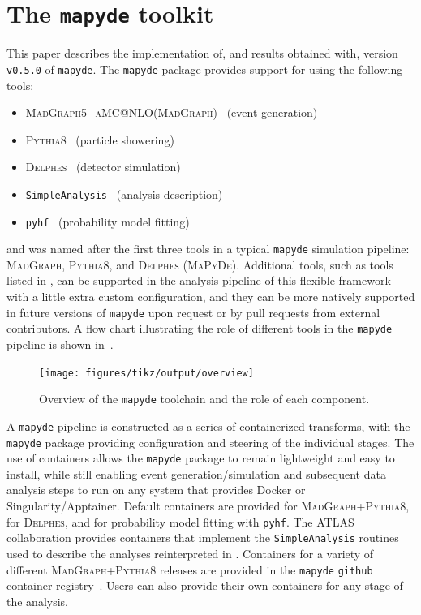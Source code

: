\documentclass{article}
\makeatletter
\newcommand{\mapyde}{\texttt{mapyde}}
\newcommand{\simpleanalysis}{\texttt{SimpleAnalysis}}
\newcommand{\madgraph}{\textsc{MadGraph}}
\newcommand{\madgraphfull}{\textsc{MadGraph5\_aMC@NLO}}
\newcommand{\pythia}{\textsc{Pythia8}}
\newcommand{\delphes}{\textsc{Delphes}}
\newcommand{\pyhf}{\texttt{pyhf}}
\makeatother
\begin{document}
\section{The \mapyde{} toolkit}
\label{sec:the-toolkit}

This paper describes the implementation of, and results obtained with, version \texttt{v0.5.0} of \mapyde.  The \mapyde{} package provides support for using the following tools:

\begin{itemize}
	\item \madgraphfull (\madgraph)~\cite{Alwall:2014hca,Frederix:2018nkq} (event generation)
	\item \pythia~\cite{Bierlich:2022pfr} (particle showering)
	\item \delphes~\cite{deFavereau:2013fsa,Selvaggi:2014mya,Mertens:2015kba} (detector simulation)
	\item \simpleanalysis~\cite{simpleanalysis,atlas_simpleanalysis} (analysis description)
	\item \pyhf~\cite{pyhf,pyhf_joss} (probability model fitting)
\end{itemize}

and was named after the first three tools in a typical \mapyde{} simulation pipeline: \madgraph, \pythia, and \delphes{} (\textsc{MaPyDe}).  Additional tools, such as tools listed in , can be supported in the analysis pipeline of this flexible framework with a little extra custom configuration, and they can be more natively supported in future versions of \mapyde{} upon request or by pull requests from external contributors.  A flow chart illustrating the role of different tools in the \mapyde{} pipeline is shown in~.

\begin{figure}[tbp]
	\centering
	\texttt{[image: figures/tikz/output/overview]}
	\caption{Overview of the \mapyde{} toolchain and the role of each component.}
	\label{fig:mapydeoverview}
\end{figure}

A \mapyde{} pipeline is constructed as a series of containerized transforms, with the \mapyde{} package providing configuration and steering of the individual stages.  The use of containers allows the \mapyde{} package to remain lightweight and easy to install, while still enabling event generation/simulation and subsequent data analysis steps to run on any system that provides Docker or Singularity/Apptainer.  Default containers are provided for \madgraph+\pythia, for \delphes, and for probability model fitting with \pyhf.  The ATLAS collaboration provides containers that implement the \simpleanalysis{} routines used to describe the analyses reinterpreted in .  Containers for a variety of different \madgraph+\pythia{} releases are provided in the \mapyde{} \texttt{github} container registry~\cite{MapydeRegistry}.  Users can also provide their own containers for any stage of the analysis.
\end{document}
